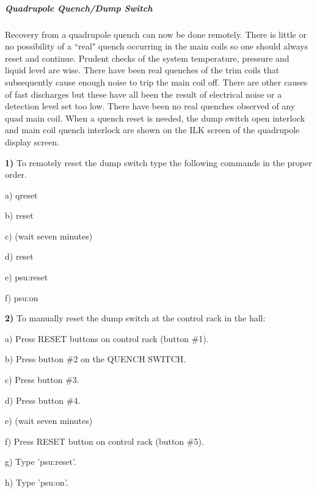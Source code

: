 {\subparagraph{Quadrupole Quench/Dump Switch}
\begin{description}
\item{}\hskip0.3in Recovery from a quadrupole quench can now be done
remotely.   There is little or no
possibility of a ``real" quench occurring in the main coils so one should
always reset and continue.  Prudent checks of the system temperature,
pressure and liquid level are wise.  There have been real quenches of
the trim coils that subsequently cause enough noise to trip the main
coil off.  There are other causes of fast discharges but these have all
been the result of electrical noise or a detection level set too low.
There have been no real quenches observed of any quad main coil.
When a quench reset is needed, the dump switch open interlock and
main coil quench interlock are shown on the ILK screen of the
quadrupole display screen.
\end{description}

\begin{description}
\item{\hskip0.3in \bf 1)}\hskip0.1in To remotely reset the dump
switch type the following commands in the proper order.
\end{description}

\begin{description}
\item{}\hskip0.5in a) qreset
\item{}\hskip0.5in b) reset
\item{}\hskip0.5in c) (wait seven minutes)
\item{}\hskip0.5in d) reset
\item{}\hskip0.5in e) psu:reset
\item{}\hskip0.5in f) psu:on
\end{description}

\begin{description}
\item{\hskip0.3in \bf 2)}\hskip0.1in To manually reset the dump
switch at the control rack in the hall:
\end{description}

\begin{description}
\item{}\hskip0.5in a) Press RESET buttons on control rack (button \#1).
\item{}\hskip0.5in b) Press button \#2 on the QUENCH SWITCH.
\item{}\hskip0.5in c) Press button \#3.
\item{}\hskip0.5in d) Press button \#4.
\item{}\hskip0.5in e) (wait seven minutes)
\item{}\hskip0.5in f) Press RESET button on control rack (button \#5).
\item{}\hskip0.5in g) Type 'psu:reset'.
\item{}\hskip0.5in h) Type 'psu:on'.
\end{description}

}
